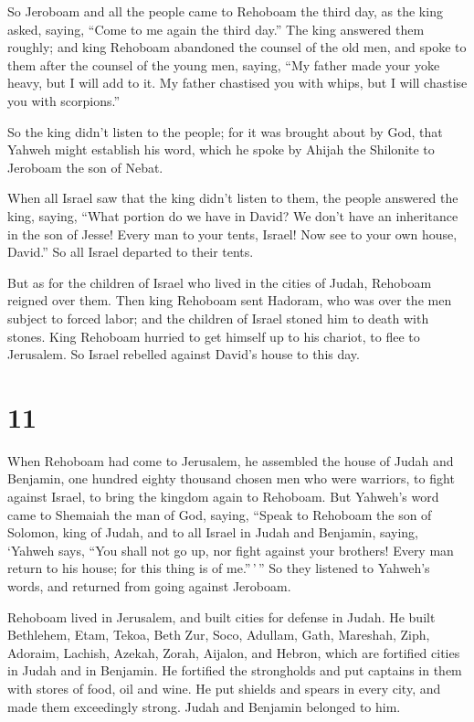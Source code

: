  So Jeroboam and all the people came to Rehoboam the third
day, as the king asked, saying, ``Come to me again the third day.''
 The king answered them roughly; and king Rehoboam
abandoned the counsel of the old men,  and spoke to them
after the counsel of the young men, saying, ``My father made your yoke
heavy, but I will add to it. My father chastised you with whips, but I
will chastise you with scorpions.''

 So the king didn't listen to the people; for it was
brought about by God, that Yahweh might establish his word, which he
spoke by Ahijah the Shilonite to Jeroboam the son of Nebat.

 When all Israel saw that the king didn't listen to them,
the people answered the king, saying, ``What portion do we have in
David? We don't have an inheritance in the son of Jesse! Every man to
your tents, Israel! Now see to your own house, David.'' So all Israel
departed to their tents.

 But as for the children of Israel who lived in the cities
of Judah, Rehoboam reigned over them.  Then king Rehoboam
sent Hadoram, who was over the men subject to forced labor; and the
children of Israel stoned him to death with stones. King Rehoboam
hurried to get himself up to his chariot, to flee to Jerusalem.
 So Israel rebelled against David's house to this day.

\hypertarget{section-10}{%
\section{11}\label{section-10}}

 When Rehoboam had come to Jerusalem, he assembled the house
of Judah and Benjamin, one hundred eighty thousand chosen men who were
warriors, to fight against Israel, to bring the kingdom again to
Rehoboam.  But Yahweh's word came to Shemaiah the man of
God, saying,  ``Speak to Rehoboam the son of Solomon, king
of Judah, and to all Israel in Judah and Benjamin, saying, 
`Yahweh says, ``You shall not go up, nor fight against your brothers!
Every man return to his house; for this thing is of me.''\,'\,'' So they
listened to Yahweh's words, and returned from going against Jeroboam.

 Rehoboam lived in Jerusalem, and built cities for defense
in Judah.  He built Bethlehem, Etam, Tekoa, 
Beth Zur, Soco, Adullam,  Gath, Mareshah, Ziph, 
Adoraim, Lachish, Azekah,  Zorah, Aijalon, and Hebron,
which are fortified cities in Judah and in Benjamin.  He
fortified the strongholds and put captains in them with stores of food,
oil and wine.  He put shields and spears in every city, and
made them exceedingly strong. Judah and Benjamin belonged to him.

